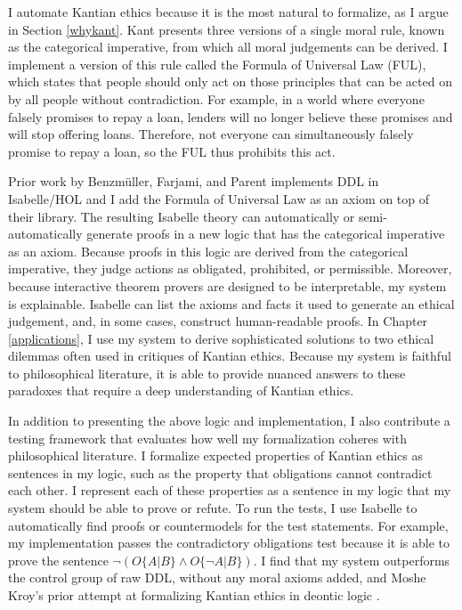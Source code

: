 \begin{isabellebody}
\begin{isamarkuptext}
I automate Kantian ethics because it is the most natural to formalize, as I argue in Section \ref{whykant}. 
Kant presents three versions of a single moral rule, known as the categorical imperative, from which 
all moral judgements can be derived. I implement a version of this rule called the Formula of Universal 
Law (FUL), which states that people should only act on those principles that can be acted on by all 
people without contradiction. For example, in a world where everyone falsely promises to repay a loan, 
lenders will no longer believe these promises and will stop offering loans. Therefore, not everyone 
can simultaneously falsely promise to repay a loan, so the FUL thus prohibits this act.

Prior work by Benzmüller, Farjami, and Parent \citep{logikey, BFP} implements DDL in Isabelle/HOL and 
I add the Formula of Universal Law as an axiom on top of their library. The resulting Isabelle theory 
can automatically or semi-automatically generate proofs in a new logic that has the categorical 
imperative as an axiom. Because proofs in this logic are derived from the categorical imperative, 
they judge actions as obligated, prohibited, or permissible. Moreover, because interactive 
theorem provers are designed to be interpretable, my system is explainable. Isabelle can list 
the axioms and facts it used to generate an ethical judgement, and, in some cases, construct 
human-readable proofs. In Chapter \ref{applications}, I use my system to derive
sophisticated solutions to two ethical dilemmas often used in critiques of Kantian ethics. Because 
my system is faithful to philosophical literature, it is able to provide nuanced answers to these paradoxes
that require a deep understanding of Kantian ethics. 

In addition to presenting the above logic and implementation, I also contribute a testing framework 
that evaluates how well my formalization coheres with philosophical literature. I formalize expected 
properties of Kantian ethics as sentences in my logic, such as the property that obligations cannot 
contradict each other. I represent each of these properties as a sentence in my logic that my system 
should be able to prove or refute. To run the tests, I use Isabelle to automatically find proofs or 
countermodels for the test statements. For example, my implementation passes the contradictory 
obligations test because it is able to prove the sentence $\neg (O\{A|B\} \wedge O\{\neg A | B\})$. 
I find that my system outperforms the control group of raw DDL, without any moral axioms added, and 
Moshe Kroy's prior attempt at formalizing Kantian ethics in deontic logic \citep{kroy}.


\end{isamarkuptext}
\end{isabellebody}
